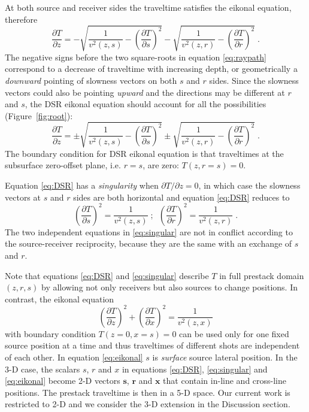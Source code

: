 At both source and receiver sides the traveltime satisfies the eikonal equation, therefore
\begin{equation}
\label{eq:raypath}
\frac{\partial T}{\partial z} = 
- \sqrt{\frac{1}{v^2 (z,s)}-\left( \frac{\partial T}{\partial s} \right)^2} 
- \sqrt{\frac{1}{v^2 (z,r)}-\left( \frac{\partial T}{\partial r} \right)^2}\;.
\end{equation}
The negative signs before the two square-roots in equation \ref{eq:raypath} correspond to a decrease of 
traveltime with increasing depth, or geometrically a \textit{downward} 
pointing of slowness vectors on both $s$ and $r$ sides. Since the slowness vectors could also be pointing 
\textit{upward} and the directions may be different at $r$ and $s$, the DSR eikonal equation \cite[]{belonosova} 
should account for all the possibilities (Figure~\ref{fig:root}):
\begin{equation}
\label{eq:DSR}
\frac{\partial T}{\partial z} = 
\pm \sqrt{\frac{1}{v^2 (z,s)}-\left( \frac{\partial T}{\partial s} \right)^2} 
\pm \sqrt{\frac{1}{v^2 (z,r)}-\left( \frac{\partial T}{\partial r} \right)^2}\;.
\end{equation}
The boundary condition for DSR eikonal equation is that traveltimes at the subsurface zero-offset plane, i.e. 
$r = s$, are zero: $T (z,r=s) = 0$.

Equation \ref{eq:DSR} has a \textit{singularity} when $\partial T / \partial z = 0$, in which case the slowness 
vectors at $s$ and $r$ sides are both horizontal and equation \ref{eq:DSR} reduces to 
\begin{equation}
\label{eq:singular}
\left( \frac{\partial T}{\partial s} \right)^2 = \frac{1}{v^2 (z,s)}\;;\,\,\,
\left( \frac{\partial T}{\partial r} \right)^2 = \frac{1}{v^2 (z,r)}\;.
\end{equation}
The two independent equations in \ref{eq:singular} are not in conflict according to the source-receiver 
reciprocity, because they are the same with an exchange of $s$ and $r$.

Note that equations \ref{eq:DSR} and \ref{eq:singular} describe $T$ in full prestack domain 
$(z,r,s)$ by allowing not only receivers but also sources to change 
positions. In contrast, the eikonal equation
\begin{equation}
\label{eq:eikonal}
\left( \frac{\partial T}{\partial z} \right)^2 + \left( \frac{\partial T}{\partial x} \right)^2 
= \frac{1}{v^2 (z,x)}
\end{equation}
with boundary condition $T (z=0,x=s) = 0$ can be used only for one fixed source position at a time and thus 
traveltimes of different shots are independent of each other. In equation \ref{eq:eikonal} $s$ is 
\textit{surface} source lateral position. In the 3-D case, the scalars $s$, $r$ and $x$ in 
equations \ref{eq:DSR}, \ref{eq:singular} and \ref{eq:eikonal} become 2-D vectors $\mathbf{s}$, $\mathbf{r}$ and 
$\mathbf{x}$ that contain in-line and cross-line positions. The prestack traveltime is then in a 5-D space. Our 
current work is restricted to 2-D and we consider the 3-D extension in the Discussion section.

